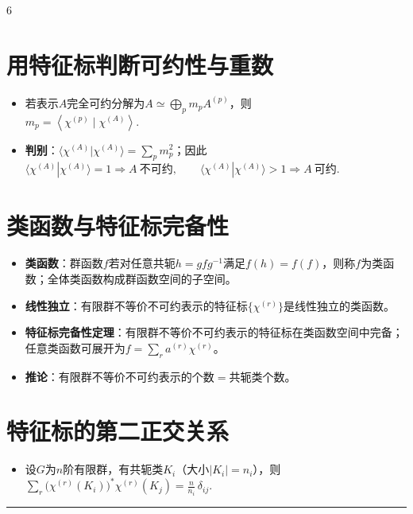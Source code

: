 \documentclass[landscape]{article}
\begin{document}
\begin{multicols*}{6}
\section*{用特征标判断可约性与重数}
\begin{itemize}
  \item 若表示$A$完全可约分解为$A\simeq \bigoplus_{p} m_p A^{(p)}$，则
  \\
  $
  m_p=\left\langle \chi^{(p)}\mid \chi^{(A)} \right\rangle.
  $
  \item \textbf{判别}：$\langle\chi^{(A)}|\chi^{(A)}\rangle=\sum_p m_p^2$；因此
  \\
  $
  \langle\chi^{(A)}|\chi^{(A)}\rangle=1 \Rightarrow A\ \text{不可约},\qquad
  \langle\chi^{(A)}|\chi^{(A)}\rangle>1 \Rightarrow A\ \text{可约}.
  $
\end{itemize}

\section*{类函数与特征标完备性}
\begin{itemize}
  \item \textbf{类函数}：群函数$f$若对任意共轭$h=gfg^{-1}$满足$f(h)=f(f)$，则称$f$为类函数；全体类函数构成群函数空间的子空间。
  \item \textbf{线性独立}：有限群不等价不可约表示的特征标$\{\chi^{(r)}\}$是线性独立的类函数。
  \item \textbf{特征标完备性定理}：有限群不等价不可约表示的特征标在类函数空间中完备；任意类函数可展开为$f=\sum_r a^{(r)}\chi^{(r)}$。
  \item \textbf{推论}：有限群不等价不可约表示的个数$=$共轭类个数。
\end{itemize}

\section*{特征标的第二正交关系}
\begin{itemize}
  \item 设$G$为$n$阶有限群，有共轭类$K_i$（大小$|K_i|=n_i$），则
  \\
  $
  \sum_{r}\big(\chi^{(r)}(K_i)\big)^{*}\chi^{(r)}(K_j)=\frac{n}{n_i}\,\delta_{ij}.
  $
\end{itemize}
\noindent\textcolor{red}{\rule{\linewidth}{1pt}}

\end{multicols*}
\end{document}
